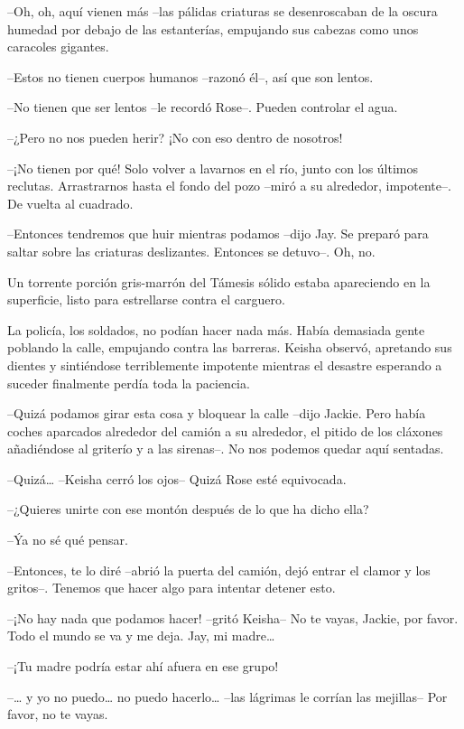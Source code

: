 {--Oh, oh, aquí vienen más --las pálidas criaturas se desenroscaban de
 la oscura humedad por debajo de las estanterías, empujando sus cabezas
como unos caracoles gigantes.}

{--Estos no tienen cuerpos humanos --razonó él--, así que son lentos.}

{--No tienen que ser lentos --le recordó Rose--. Pueden controlar el
agua.}

{--¿Pero no nos pueden herir? ¡No con eso dentro de nosotros!}

{--¡No tienen por qué! Solo volver a lavarnos en el río, junto con los
 últimos reclutas. Arrastrarnos hasta el fondo del pozo --miró a su
alrededor, impotente--. De vuelta al cuadrado.}

{--Entonces tendremos que huir mientras podamos --dijo Jay. Se preparó
 para saltar sobre las criaturas deslizantes. Entonces se detuvo--. Oh,
no.}

{Un torrente porción gris-marrón del Támesis sólido estaba apareciendo
en la superficie, listo para estrellarse contra el carguero.}

\mbox{}

{La policía, los soldados, no podían hacer nada más. Había demasiada
 gente poblando la calle, empujando contra las barreras. Keisha observó,
 apretando sus dientes y sintiéndose terriblemente impotente mientras el
desastre esperando a suceder finalmente perdía toda la paciencia.}

{--Quizá podamos girar esta cosa y bloquear la calle --dijo Jackie. Pero
 había coches aparcados alrededor del camión a su alrededor, el pitido de
 los cláxones añadiéndose al griterío y a las sirenas--. No nos podemos
quedar aquí sentadas.}

{--Quizá\ldots{} --Keisha cerró los ojos-- Quizá Rose esté equivocada.}

{--¿Quieres unirte con ese montón después de lo que ha dicho ella?}

{--Ýa no sé qué pensar.}

{--Entonces, te lo diré --abrió la puerta del camión, dejó entrar el
 clamor y los gritos--. Tenemos que hacer algo para intentar detener
esto.}

{--¡No hay nada que podamos hacer! --gritó Keisha-- No te vayas, Jackie,
 por favor. Todo el mundo se va y me deja. Jay, mi madre\ldots{}}

{--¡Tu madre podría estar ahí afuera en ese grupo!}

{--\ldots{} y yo no puedo\ldots{} no puedo hacerlo\ldots{} --las
lágrimas le corrían las mejillas-- Por favor, no te vayas.}

